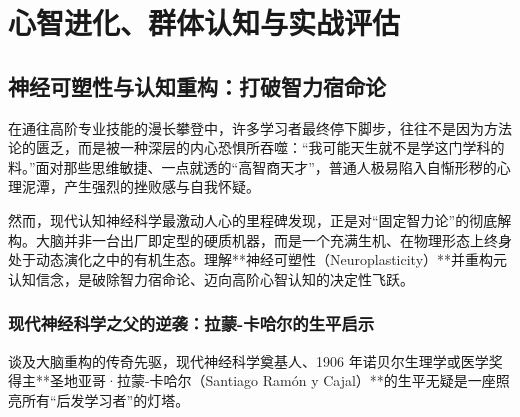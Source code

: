 \documentclass[12pt,a4paper,openany]{ctexbook}
\begin{document}
\part{心智进化、群体认知与实战评估}

\chapter{神经可塑性与认知重构：打破智力宿命论}

在通往高阶专业技能的漫长攀登中，许多学习者最终停下脚步，往往不是因为方法论的匮乏，而是被一种深层的内心恐惧所吞噬：“我可能天生就不是学这门学科的料。”面对那些思维敏捷、一点就透的“高智商天才”，普通人极易陷入自惭形秽的心理泥潭，产生强烈的挫败感与自我怀疑。

然而，现代认知神经科学最激动人心的里程碑发现，正是对“固定智力论”的彻底解构。大脑并非一台出厂即定型的硬质机器，而是一个充满生机、在物理形态上终身处于动态演化之中的有机生态。理解**神经可塑性（Neuroplasticity）**并重构元认知信念，是破除智力宿命论、迈向高阶心智认知的决定性飞跃。

\section{现代神经科学之父的逆袭：拉蒙-卡哈尔的生平启示}

谈及大脑重构的传奇先驱，现代神经科学奠基人、1906 年诺贝尔生理学或医学奖得主**圣地亚哥·拉蒙-卡哈尔（Santiago Ramón y Cajal）**的生平无疑是一座照亮所有“后发学习者”的灯塔。
\end{document}

